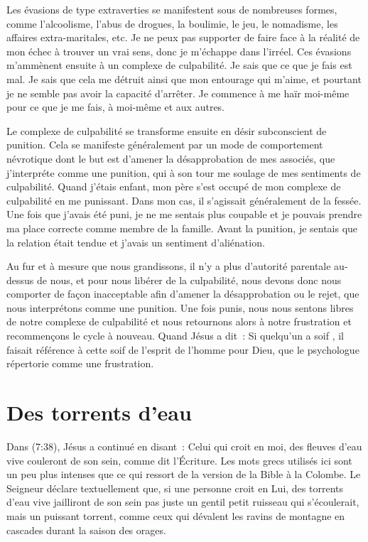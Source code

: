 \begin{specialpar}{}
Les évasions de type extraverties se manifestent sous de nombreuses formes,
 comme l'alcoolisme, l'abus de drogues, la boulimie, le jeu, le nomadisme,
 les affaires extra-maritales, etc.
 Je ne peux pas supporter de faire face à la réalité de mon échec à trouver
 un vrai sens, donc je m'échappe dans l'irréel.
 Ces évasions m'ammènent ensuite à un complexe de culpabilité.
 Je sais que ce que je fais est mal. Je sais que cela me détruit
 ainsi que mon entourage qui m'aime, et pourtant je ne semble pas avoir
 la capacité d'arrêter. Je commence à me haïr moi-même pour ce que je me fais,
 à moi-même et aux autres.
\end{specialpar}

Le complexe de culpabilité se transforme ensuite en désir subconscient
 de punition. Cela se manifeste généralement par un mode de comportement
 névrotique dont le but est d'amener la désapprobation de mes associés,
 que j'interpréte comme une punition, qui à son tour me soulage
 de mes sentiments de culpabilité. Quand j'étais enfant, mon père
 s'est occupé de mon complexe de culpabilité en me punissant.
 Dans mon cas, il s'agissait généralement de la fessée.
 Une fois que j'avais été puni, je ne me sentais plus coupable
 et je pouvais prendre ma place correcte comme membre de la famille.
 Avant la punition, je sentais que la relation était tendue et j'avais
 un sentiment d'aliénation.

Au fur et à mesure que nous grandissons, il n'y a plus d'autorité parentale
 au-dessus de nous, et pour nous libérer de la culpabilité, nous devons donc
 nous comporter de façon inacceptable afin d'amener la désapprobation
 ou le rejet, que nous interprétons comme une punition.
 Une fois punis, nous nous sentons libres de notre complexe de culpabilité
 et nous retournons alors à notre frustration et recommençons le cycle
 à nouveau. Quand Jésus a dit~: \og Si quelqu'un a soif \fg{},
 il faisait référence à cette soif de l'esprit de l'homme pour Dieu,
 que le psychologue répertorie comme une frustration.


\section*{Des torrents d'eau}

Dans (7:38), Jésus a continué en disant~:
 \og Celui qui croit en moi, des fleuves d'eau vive couleront de son sein,
 comme dit l'Écriture. \fg{}
 Les mots grecs utilisés ici sont un peu plus intenses que ce qui ressort
 de la version de la Bible à la Colombe. Le Seigneur déclare textuellement
 que, si une personne croit en Lui, \og des torrents d'eau vive jailliront
 de son sein \fg{} \ocadr pas juste un gentil petit ruisseau qui s'écoulerait,
 mais un puissant torrent, comme ceux qui dévalent les ravins de montagne
 en cascades durant la saison des orages.

